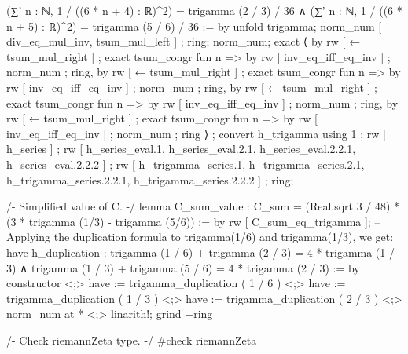 {                         (∑' n : ℕ, 1 / ((6 * n + 4) : ℝ)^2) = trigamma (2 / 3) / 36 ∧
                         (∑' n : ℕ, 1 / ((6 * n + 5) : ℝ)^2) = trigamma (5 / 6) / 36 := by
                           unfold trigamma; norm_num [ div_eq_mul_inv, tsum_mul_left ] ; ring; norm_num;
                           exact ⟨ by rw [ ← tsum_mul_right ] ; exact tsum_congr fun n => by rw [ inv_eq_iff_eq_inv ] ; norm_num ; ring, by rw [ ← tsum_mul_right ] ; exact tsum_congr fun n => by rw [ inv_eq_iff_eq_inv ] ; norm_num ; ring, by rw [ ← tsum_mul_right ] ; exact tsum_congr fun n => by rw [ inv_eq_iff_eq_inv ] ; norm_num ; ring, by rw [ ← tsum_mul_right ] ; exact tsum_congr fun n => by rw [ inv_eq_iff_eq_inv ] ; norm_num ; ring ⟩ ;
  convert h_trigamma using 1 ; rw [ h_series ] ; rw [ h_series_eval.1, h_series_eval.2.1, h_series_eval.2.2.1, h_series_eval.2.2.2 ] ; rw [ h_trigamma_series.1, h_trigamma_series.2.1, h_trigamma_series.2.2.1, h_trigamma_series.2.2.2 ] ; ring;

/-
Simplified value of C.
-/
lemma C_sum_value : C_sum = (Real.sqrt 3 / 48) * (3 * trigamma (1/3) - trigamma (5/6)) := by
  rw [ C_sum_eq_trigamma ];
  -- Applying the duplication formula to trigamma(1/6) and trigamma(1/3), we get:
  have h_duplication : trigamma (1 / 6) + trigamma (2 / 3) = 4 * trigamma (1 / 3) ∧ trigamma (1 / 3) + trigamma (5 / 6) = 4 * trigamma (2 / 3) := by
    constructor <;> have := trigamma_duplication ( 1 / 6 ) <;> have := trigamma_duplication ( 1 / 3 ) <;> have := trigamma_duplication ( 2 / 3 ) <;> norm_num at * <;> linarith!;
  grind +ring

/-
Check riemannZeta type.
-/
#check riemannZeta

}
